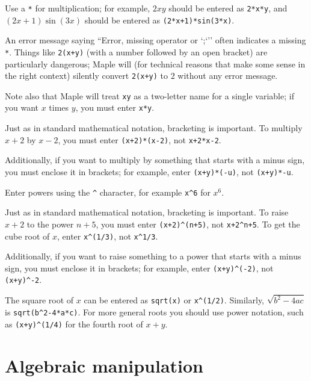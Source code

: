 \documentclass{amsart}
\begin{document}
\begin{secenum}
 \item\label{star} Use a \verb~*~ for multiplication; for example,
 $2xy$ should be entered as \verb~2*x*y~, and $(2x+1)\sin(3x)$
 should be entered as \verb~(2*x+1)*sin(3*x)~. 
%
 \item\label{missingstar}
 An error message saying ``Error, missing operator or `;`''
 often indicates a missing \verb~*~.  Things like
 \verb~2(x+y)~ (with a number followed by an open bracket)
 are particularly dangerous; Maple will (for technical
 reasons that make some sense in the right context) silently
 convert \verb~2(x+y)~ to $2$ without any error message. 
%
 \item\label{twoletters}
 Note also that Maple will treat \verb~xy~ as a two-letter
 name for a single variable; if you want $x$ times $y$, you
 must enter \verb~x*y~. 
%
 \item\label{timesbrackets}
 Just as in standard mathematical notation, bracketing is
 important.  To multiply $x+2$ by $x-2$, you must enter
 \verb~(x+2)*(x-2)~, not \verb~x+2*x-2~.  
%
 \item\label{timesminus}
 Additionally, if you want to multiply
 by something that starts with a minus sign, you must
 enclose it in brackets; for example, enter
 \verb~(x+y)*(-u)~, not \verb~(x+y)*-u~. 
%
 \item\label{powers} Enter powers using the \verb~^~ character,
 for example \verb~x^6~ for $x^6$. 
%
 \item\label{powerbrackets}
 Just as in standard mathematical notation, bracketing is
 important.  To raise $x+2$ to the power $n+5$, you must
 enter \verb~(x+2)^(n+5)~, not \verb~x+2^n+5~.  To get the
 cube root of $x$, enter \verb~x^(1/3)~, not
 \verb~x^1/3~.  
%
 \item\label{powerminus}
 Additionally, if you want to raise something to a power
 that starts with a minus sign, you must enclose it in
 brackets; for example, enter \verb~(x+y)^(-2)~, not
 \verb~(x+y)^-2~. 
%
 \item\label{sqrt} The square root of $x$ can be entered as
 \verb~sqrt(x)~ or \verb~x^(1/2)~.  Similarly,
 $\sqrt{b^2-4ac}$ is \verb~sqrt(b^2-4*a*c)~.  For more
 general roots you should use power notation, such as
 \verb~(x+y)^(1/4)~ for the fourth root of $x+y$. 
\end{secenum}

\section{Algebraic manipulation}
\end{document}
